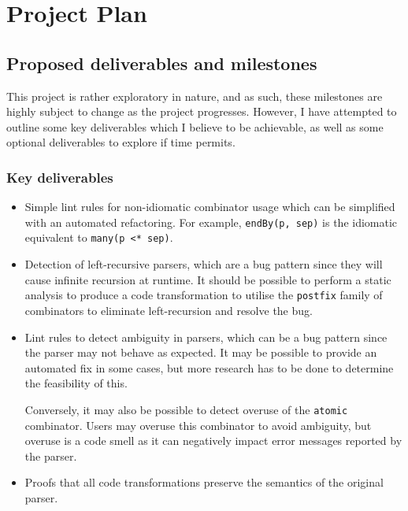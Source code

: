 \chapter{Project Plan}
\section{Proposed deliverables and milestones}
This project is rather exploratory in nature, and as such, these milestones are highly subject to change as the project progresses.
However, I have attempted to outline some key deliverables which I believe to be achievable, as well as some optional deliverables to explore if time permits.

\subsection{Key deliverables}
\begin{itemize}
  \item
  Simple lint rules for non-idiomatic combinator usage which can be simplified with an automated refactoring.
  For example, \texttt{endBy(p, sep)} is the idiomatic equivalent to \texttt{many(p <* sep)}.
  \item
  Detection of left-recursive parsers, which are a bug pattern since they will cause infinite recursion at runtime.
  It should be possible to perform a static analysis to produce a code transformation to utilise the \texttt{postfix} family of combinators to eliminate left-recursion and resolve the bug.
  \item
  Lint rules to detect ambiguity in parsers, which can be a bug pattern since the parser may not behave as expected.
  It may be possible to provide an automated fix in some cases, but more research has to be done to determine the feasibility of this.

  Conversely, it may also be possible to detect overuse of the \texttt{atomic} combinator.
  Users may overuse this combinator to avoid ambiguity, but overuse is a code smell as it can negatively impact error messages reported by the parser.
  \item
  Proofs that all code transformations preserve the semantics of the original parser.
\end{itemize}

